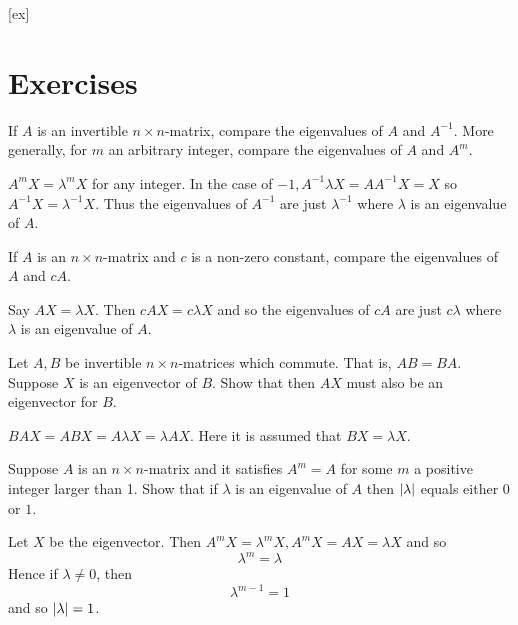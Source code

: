 [ex]
\section*{Exercises}

\begin{enumialphparenastyle}

\begin{ex} If $A$ is an invertible $n\times n$-matrix, compare the eigenvalues of
$A$ and $A^{-1}$. More generally, for $m$ an arbitrary integer, compare the
eigenvalues of $A$ and $A^{m}$. \vspace{1mm}
\begin{sol}
$A^{m}X=\lambda ^{m}X$ for
any integer. In the case of $-1,A^{-1}\lambda X=AA^{-1}X=X$
so $A^{-1}X =\lambda ^{-1}X$. Thus the eigenvalues of $A^{-1}$ are just $\lambda ^{-1}$ where $\lambda $ is an eigenvalue of $A$.
\end{sol}
\end{ex} 

\begin{ex} If $A$ is an $n\times n$-matrix and $c$ is a non-zero constant, compare
the eigenvalues of $A$ and $cA$. \vspace{1mm} 
\begin{sol}
Say $AX=\lambda X$. Then $
cAX=c\lambda X$ and so the eigenvalues of $cA$ are just $
c\lambda $ where $\lambda $ is an eigenvalue of $A$.
\end{sol}
\end{ex}

\begin{ex} Let $A,B$ be invertible $n\times n$-matrices which commute. That is, $AB=BA$. Suppose $X$ is an eigenvector of $B$. Show that then 
$AX$ must also be an eigenvector for $B$. \vspace{1mm} 
\begin{sol}
 $BAX=ABX
=A\lambda X=\lambda AX$. Here it is assumed that $BX=\lambda X$.
\end{sol}
\end{ex}

\begin{ex} Suppose $A$ is an $n\times n$-matrix and it satisfies $A^{m}=A$ for
some $m$ a positive integer larger than 1. Show that if $\lambda $ is an
eigenvalue of $A$ then $\left|\lambda \right|$ equals either 0 or $
1$. \vspace{1mm}
\begin{sol}
Let $X$ be the eigenvector. Then $A^{m}X=\lambda ^{m}
X,A^{m}X=AX=\lambda X$ and so
\[
\lambda ^{m}=\lambda
\]
Hence if $\lambda \neq 0$, then
\[
\lambda ^{m-1}=1
\]
and so $\left|\lambda \right|=1$.
\end{sol}
\end{ex}


\end{enumialphparenastyle}
